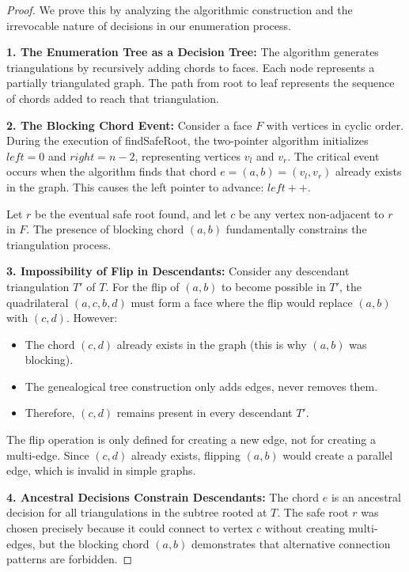 \documentclass[12pt,a4paper]{article}
\begin{document}
\begin{proof}
We prove this by analyzing the algorithmic construction and the irrevocable nature of decisions in our enumeration process.

\textbf{1. The Enumeration Tree as a Decision Tree:}
The algorithm generates triangulations by recursively adding chords to faces. Each node represents a partially triangulated graph. The path from root to leaf represents the sequence of chords added to reach that triangulation.

\textbf{2. The Blocking Chord Event:}
Consider a face $F$ with vertices in cyclic order. During the execution of findSafeRoot, the two-pointer algorithm initializes $left = 0$ and $right = n-2$, representing vertices $v_l$ and $v_r$. The critical event occurs when the algorithm finds that chord $e = (a,b) = (v_l, v_r)$ already exists in the graph. This causes the left pointer to advance: $left++$.

Let $r$ be the eventual safe root found, and let $c$ be any vertex non-adjacent to $r$ in $F$. The presence of blocking chord $(a,b)$ fundamentally constrains the triangulation process.

\textbf{3. Impossibility of Flip in Descendants:}
Consider any descendant triangulation $T'$ of $T$. For the flip of $(a,b)$ to become possible in $T'$, the quadrilateral $(a,c,b,d)$ must form a face where the flip would replace $(a,b)$ with $(c,d)$. However:

\begin{itemize}
    \item The chord $(c,d)$ already exists in the graph (this is why $(a,b)$ was blocking).
    \item The genealogical tree construction only adds edges, never removes them.
    \item Therefore, $(c,d)$ remains present in every descendant $T'$.
\end{itemize}

The flip operation is only defined for creating a new edge, not for creating a multi-edge. Since $(c,d)$ already exists, flipping $(a,b)$ would create a parallel edge, which is invalid in simple graphs.

\textbf{4. Ancestral Decisions Constrain Descendants:}
The chord $e$ is an ancestral decision for all triangulations in the subtree rooted at $T$. The safe root $r$ was chosen precisely because it could connect to vertex $c$ without creating multi-edges, but the blocking chord $(a,b)$ demonstrates that alternative connection patterns are forbidden.


\end{proof}
\end{document}
